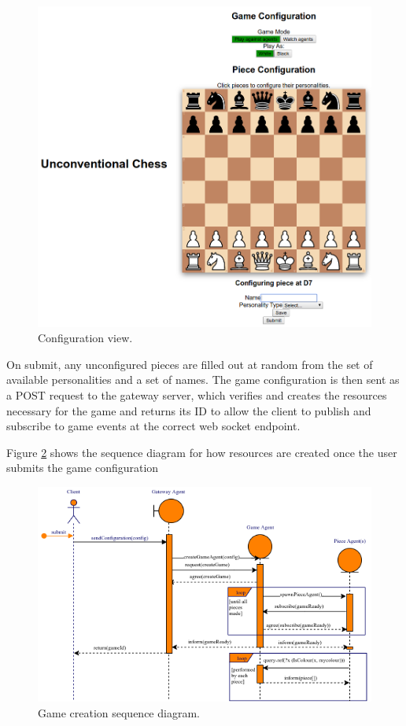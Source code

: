 \documentclass{article}
\begin{document}
\begin{figure}[!h]
	\centering
	\includegraphics[width=0.9\linewidth]{images/configview}
	\caption{Configuration view.}
	\label{fig:configview}
\end{figure}

On submit, any unconfigured pieces are filled out at random from the set of available personalities and a set of names. The game configuration is then sent as a POST request to the gateway server, which verifies and creates the resources necessary for the game and returns its ID to allow the client to publish and subscribe to game events at the correct web socket endpoint.

Figure \ref{fig:gamecreation} shows the sequence diagram for how resources are created once the user submits the game configuration

\begin{figure}[!h]
	\centering
	\includegraphics[width=\linewidth]{images/gamecreation}
	\caption{Game creation sequence diagram.}
	\label{fig:gamecreation}
\end{figure}
\end{document}
